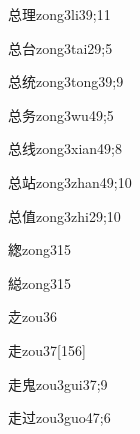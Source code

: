 \begin{verbete}{总理}{zong3li3}{9;11}
\end{verbete}

\begin{verbete}{总台}{zong3tai2}{9;5}
\end{verbete}

\begin{verbete}{总统}{zong3tong3}{9;9}
\end{verbete}

\begin{verbete}{总务}{zong3wu4}{9;5}
\end{verbete}

\begin{verbete}{总线}{zong3xian4}{9;8}
\end{verbete}

\begin{verbete}{总站}{zong3zhan4}{9;10}
\end{verbete}

\begin{verbete}{总值}{zong3zhi2}{9;10}
\end{verbete}

\begin{verbete}{緫}{zong3}{15}
\end{verbete}

\begin{verbete}{縂}{zong3}{15}
\end{verbete}

\begin{verbete}{赱}{zou3}{6}
\end{verbete}

\begin{verbete}{走}{zou3}{7}[156]
\end{verbete}

\begin{verbete}{走鬼}{zou3gui3}{7;9}
\end{verbete}

\begin{verbete}{走过}{zou3guo4}{7;6}
\end{verbete}

